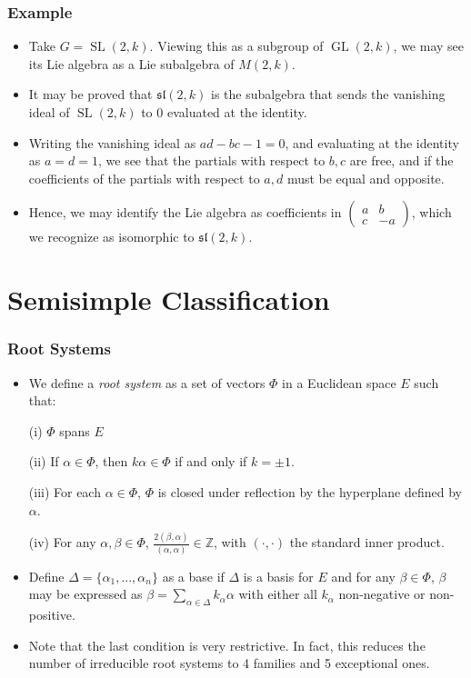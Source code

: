 \documentclass{beamer}
\theoremstyle{remark}
\begin{document}
\begin{frame}
\frametitle{Example}
\begin{itemize}
\item Take $G = \operatorname{SL}(2,k)$. Viewing this as a subgroup of $\operatorname{GL}(2,k)$, we may see its Lie algebra as a Lie subalgebra of $M(2,k)$.
\pause
\item It may be proved that $\mathfrak{sl}(2,k)$ is the subalgebra that sends the vanishing ideal of $\operatorname{SL}(2,k)$ to $0$ evaluated at the identity.
\pause
\item Writing the vanishing ideal as $ad - bc -1 = 0$, and evaluating at the identity as $a = d = 1$, we see that the partials with respect to $b, c$ are free, and if the coefficients of the partials with respect to $a, d$ must be equal and opposite. 
\pause
\item Hence, we may identify the Lie algebra as coefficients in $\begin{pmatrix} a & b \\ c & -a \end{pmatrix}$, which we recognize as isomorphic to $\mathfrak{sl}(2,k)$. 
\end{itemize}
\end{frame}

\section{Semisimple Classification}

\begin{frame}
\frametitle{Root Systems}
\begin{itemize}
\item We define a \emph{root system} as a set of vectors $\Phi$ in a Euclidean space $E$ such that:

(i) $\Phi$ spans $E$

(ii) If $\alpha \in \Phi$, then $k \alpha \in \Phi$ if and only if $k = \pm 1$.

(iii) For each $\alpha \in \Phi$, $\Phi$ is closed under reflection by the hyperplane defined by $\alpha$.

(iv) For any $\alpha, \beta \in \Phi$, $\frac{2 (\beta, \alpha)}{(\alpha, \alpha)} \in \mathbb{Z}$, with $( \cdot, \cdot)$ the standard inner product.
\pause
\item Define $\Delta = \{ \alpha_1, ..., \alpha_n \}$ as a base if $\Delta$ is a basis for $E$ and for any $\beta \in \Phi$, $\beta$ may be expressed as $\beta = \sum_{\alpha \in \Delta} k_\alpha \alpha$ with either all $k_\alpha$ non-negative or non-positive.
\pause
\item Note that the last condition is very restrictive. In fact, this reduces the number of irreducible root systems to 4 families and 5 exceptional ones.
\end{itemize}
\end{frame}
\end{document}
